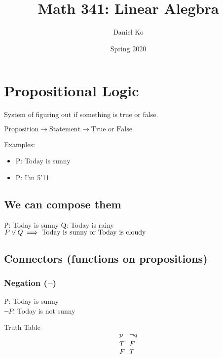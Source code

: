 \documentclass[a4paper]{article}
\title{Math 341: Linear Alegbra}
\author{Daniel Ko}
\date{Spring 2020}
\begin{document}
\maketitle


\section{Propositional Logic}
System of figuring out if something is true or false.

\(\text{Proposition} \rightarrow \text{Statement} \rightarrow \text{True or False}\)

Examples:
\begin{itemize}
	\item P: Today is sunny 
	\item P: I'm 5'11
\end{itemize}

\subsection{We can compose them}
P: Today is sunny
Q: Today is rainy
\\
$P \lor Q \implies \hbox{Today is sunny or Today is cloudy}$

\subsection{Connectors (functions on propositions)}

\subsubsection{Negation ($\lnot$)}

P: Today is sunny
\\
$\lnot P$: Today is not sunny
\begin{center}
Truth Table
\begin{displaymath}
\begin{array}{|c|c|}
p & \lnot q \\ 
T & F \\
F & T \\
\end{array}
\end{displaymath}
\end{center}
\end{document}
